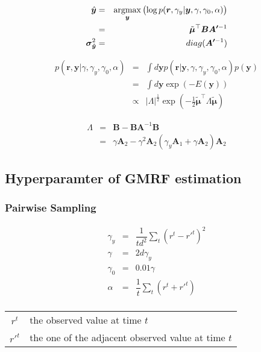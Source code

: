 \documentclass[platex, a4paper]{jsarticle}
\newcommand{\argmax}{\mathop{\rm argmax}\limits}
\begin{document}
\begin{eqnarray}
  \hat{\bm{y}}
      &=& \argmax_{\bm{y}} \left( \log p(\bm{r},\gamma_y | \bm{y},\gamma, \gamma_0, \alpha) \right)\\
      &=& \T{\tilde{\bm{\mu}}}\bm{B} \bm{A'}^{-1} \\
  \bm{\sigma_{\hat{\bm{y}}}}^2
      &=& diag (\bm{A'}^{-1}) \\
\end{eqnarray}

\begin{eqnarray}
  p( \bm{r}, \bm{y} | \gamma, \gamma_y, \gamma_0, \alpha)
    &=& \int d\bm{y}  p( \bm{r}|\bm{y}, \gamma, \gamma_y, \gamma_0, \alpha ) p(\bm{y} ) \\
    &=&  \int d\bm{y}  \exp\left(- E(\bm{y} ) \right) \\
    &\propto& |\Lambda|^{\frac{1}{2}}  \exp\left( - \frac{1}{2} \tilde{\bm{\mu}}^\top \Lambda \tilde{\bm{\mu}}\right)
\end{eqnarray}

\begin{eqnarray}
  \Lambda &=& \bm{B} - \bm{B} \bm{A}^{-1} \bm{B}\\
           &=& \gamma \bm{A}_2 - \gamma^2 \bm{A}_2 (\gamma_y \bm{A}_1 + \gamma \bm{A}_2) \bm{A}_2
\end{eqnarray}


\subsection{Hyperparamter of GMRF estimation}
\subsubsection{Pairwise Sampling}
\begin{eqnarray*}
\gamma_y &=& \dfrac{1}{td^2} \sum_t (r^t - {r'}^t)^2 \\
\gamma &=& 2d\gamma_y \\
\gamma_0 &=& 0.01 \gamma \\
\alpha &=& \dfrac{1}{t} \sum_t (r^t + {r'}^t) \\
\end{eqnarray*}

\begin{table}[htb]
\begin{tabular}{cl}
${r}^t$&the observed value at time $t$ \\
${r'}^t$&the one of the adjacent observed value at time $t$\\
\end{tabular}
\end{table}
\end{document}
